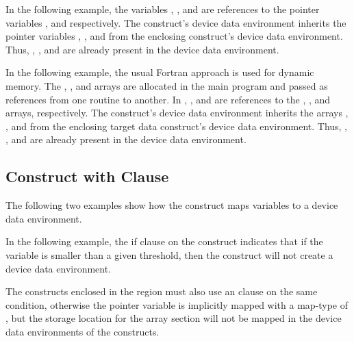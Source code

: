 In the following example, the variables , , and  are references to the pointer 
variables ,  and  respectively. The  construct's device data 
environment inherits the pointer variables , , and  from the enclosing 
 construct's device data environment. Thus, , , and  are already 
present in the device data environment.


In the following example, the usual Fortran approach is used for dynamic memory. 
The , , and  arrays are allocated in the main program and passed as references 
from one routine to another. In , ,  and  are references to the 
, , and  arrays, respectively. The  construct's device data 
environment inherits the arrays , , and  from the enclosing target data construct's 
device data environment. Thus, , , and  are already present in the device 
data environment.


\subsection{ Construct with  Clause}
\label{subsec:target_data_if}

The following two examples show how the  construct 
maps variables to a device data environment.

In the following example, the if clause on the  construct 
indicates that if the variable  is smaller than a given threshold, then 
the  construct will not create a device data environment.

The  constructs enclosed in the  region 
must also use an  clause on the same condition, otherwise the pointer 
variable  is implicitly mapped with a map-type of , but the storage 
location for the array section  will not be mapped in the device data environments 
of the  constructs.

